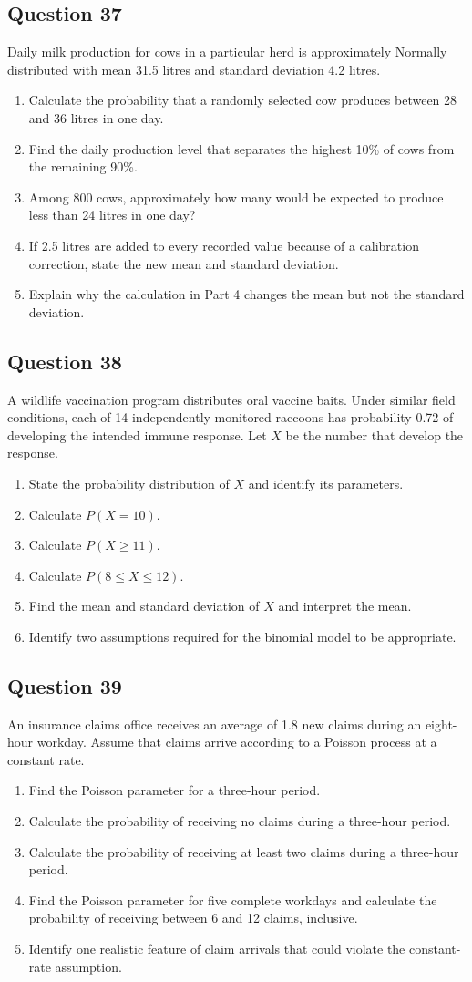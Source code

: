 \documentclass[10pt,letterpaper]{article}
\newcommand{\questionheading}[1]{%
  \subsection*{Question #1}
}
\begin{document}
\questionheading{37}
Daily milk production for cows in a particular herd is approximately Normally distributed with mean 31.5 litres and standard deviation 4.2 litres.
\begin{enumerate}
	\item Calculate the probability that a randomly selected cow produces between 28 and 36 litres in one day.
	\item Find the daily production level that separates the highest 10\% of cows from the remaining 90\%.
	\item Among 800 cows, approximately how many would be expected to produce less than 24 litres in one day?
	\item If 2.5 litres are added to every recorded value because of a calibration correction, state the new mean and standard deviation.
	\item Explain why the calculation in Part 4 changes the mean but not the standard deviation.
\end{enumerate}

\questionheading{38}
A wildlife vaccination program distributes oral vaccine baits. Under similar field conditions, each of 14 independently monitored raccoons has probability 0.72 of developing the intended immune response. Let $X$ be the number that develop the response.
\begin{enumerate}
	\item State the probability distribution of $X$ and identify its parameters.
	\item Calculate $P(X=10)$.
	\item Calculate $P(X\geq11)$.
	\item Calculate $P(8\leq X\leq12)$.
	\item Find the mean and standard deviation of $X$ and interpret the mean.
	\item Identify two assumptions required for the binomial model to be appropriate.
\end{enumerate}

\questionheading{39}
An insurance claims office receives an average of 1.8 new claims during an eight-hour workday. Assume that claims arrive according to a Poisson process at a constant rate.
\begin{enumerate}
	\item Find the Poisson parameter for a three-hour period.
	\item Calculate the probability of receiving no claims during a three-hour period.
	\item Calculate the probability of receiving at least two claims during a three-hour period.
	\item Find the Poisson parameter for five complete workdays and calculate the probability of receiving between 6 and 12 claims, inclusive.
	\item Identify one realistic feature of claim arrivals that could violate the constant-rate assumption.
\end{enumerate}
\end{document}
